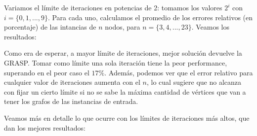 Variamos el límite de iteraciones en potencias de 2: tomamos los valores $2^i$ con $i = \{0,1,...,9\}$. Para cada uno, calculamos el promedio de los errores relativos (en porcentaje) de las intancias de $n$ nodos, para $n = \{3,4,...,23\}$. Veamos los resultados:

\begin{figure}[H]
    \begin{minipage}[t]{\linewidth}
		\centering
		\label{fig:ejercicio-5-calidad-todos-conjunto-1}
    \end{minipage}
\end{figure}

Como era de esperar, a mayor límite de iteraciones, mejor solución devuelve la GRASP. Tomar como límite una sola iteración tiene la peor performance, superando en el peor caso el $17\%$. Además, podemos ver que el error relativo para cualquier valor de iteraciones aumenta con el $n$, lo cual sugiere que no alcanza con fijar un cierto límite si no se sabe la máxima cantidad de vértices que van a tener los grafos de las instancias de entrada.

Veamos más en detalle lo que ocurre con los límites de iteraciones más altos, que dan los mejores resultados:

